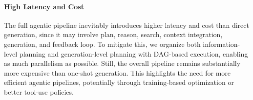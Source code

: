 \paragraph{High Latency and Cost}
The full agentic pipeline inevitably introduces higher latency and cost than direct generation, since it may involve plan, reason, search, context integration, generation, and feedback loop. To mitigate this, we organize both information-level planning and generation-level planning with DAG-based execution, enabling as much parallelism as possible. Still, the overall pipeline remains substantially more expensive than one-shot generation. This highlights the need for more efficient agentic pipelines, potentially through training-based optimization or better tool-use policies.